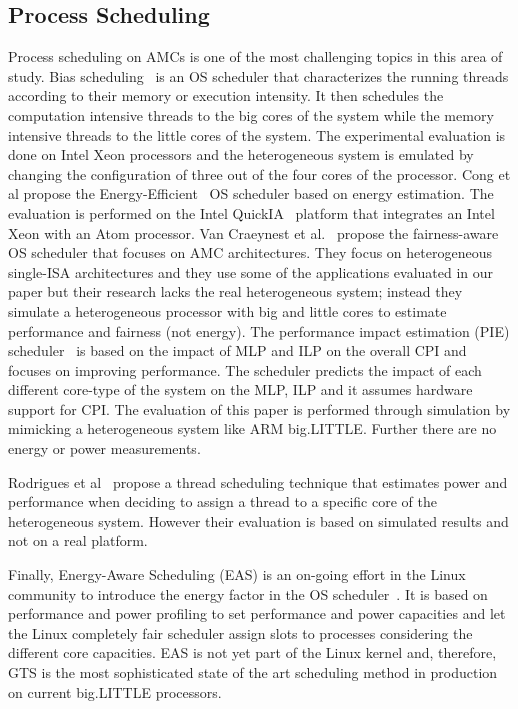 \subsection{Process Scheduling}
Process scheduling on AMCs is one of the most challenging topics in this area of study.
Bias scheduling~\cite{Koufaty_bias} is an OS scheduler that characterizes the running 
threads according to their memory or execution intensity. 
It then schedules the computation intensive threads to the big cores of the system while the memory intensive threads to the little cores of the system.
The experimental evaluation is done on Intel Xeon processors and the heterogeneous system is emulated by changing the configuration of three out of the four cores of the processor.
Cong et al propose the Energy-Efficient~\cite{Cong_quickIA} OS scheduler based on energy estimation. The evaluation is performed on the Intel QuickIA~\cite{quickIA} platform that integrates an Intel Xeon with an Atom processor. 
Van Craeynest et al.~\cite{VanCraeynest_fairness} propose the fairness-aware OS scheduler that focuses on AMC architectures. 
They focus on heterogeneous single-ISA architectures and they use some of the applications evaluated in our paper but their research lacks the real heterogeneous system; instead they simulate a heterogeneous processor with big and little cores to estimate performance and fairness (not energy).
The performance impact estimation (PIE) scheduler~\cite{VanCraeynest_PIE} is based on the impact of MLP and ILP on the overall CPI and focuses on improving performance.
The scheduler predicts the impact of each different core-type of the system on the MLP, ILP and it assumes hardware support for CPI. 
The evaluation of this paper is performed through simulation by mimicking a heterogeneous system like ARM big.LITTLE. 
Further there are no energy or power measurements.


Rodrigues et al~\cite{Rodrigues_thread_scheduling} propose a thread scheduling technique that estimates power and performance when deciding to assign a thread to a specific core of the heterogeneous system. 
However their evaluation is based on simulated results and not on a real platform. %

Finally, Energy-Aware Scheduling (EAS) is an on-going effort in the Linux community to introduce the energy factor in the OS scheduler~\cite{EAS, EAS_Linux}. 
It is based on performance and power profiling to set performance and power capacities and let the Linux completely fair scheduler assign slots to processes considering the different core capacities. 
EAS is not yet part of the Linux kernel and, therefore, GTS is the most sophisticated state of the art scheduling method in production on current big.LITTLE processors.


